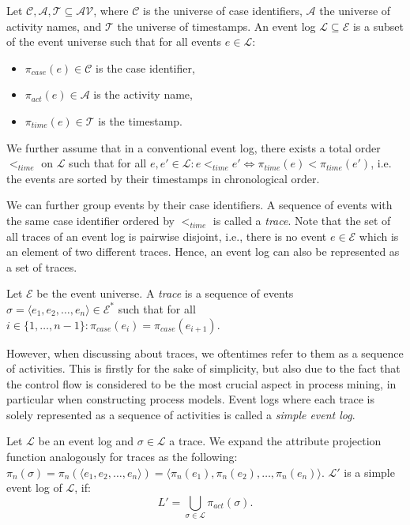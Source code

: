 \begin{definition}
    Let $\mathcal{C, A, T} \subseteq \mathcal{AV}$, where $\mathcal{C}$ is the universe of case identifiers, $\mathcal{A}$ the universe of activity names, and $\mathcal{T}$ the universe of timestamps.  An event log $\mathcal{L} \subseteq \mathcal{E}$ is a subset of the event universe such that for all events $e \in \mathcal{L}$:
    
    \begin{itemize}
        \item $\pi_{case}(e) \in \mathcal{C}$ is the case identifier,
        \item $\pi_{act}(e) \in \mathcal{A}$ is the activity name,
        \item $\pi_{time}(e) \in \mathcal{T}$ is the timestamp.
    \end{itemize}
\end{definition}

We further assume that in a conventional event log, there exists a total order $<_{time}$ on $\mathcal{L}$ such that for all $e, e' \in \mathcal{L}: e <_{time} e' \Leftrightarrow \pi_{time}(e) < \pi_{time}(e')$, i.e. the events are sorted by their timestamps in chronological order.

We can further group events by their case identifiers. A sequence of events with the same case identifier ordered by $<_{time}$ is called a \emph{trace}. Note that the set of all traces of an event log is pairwise disjoint, i.e., there is no event $e \in \mathcal{E}$ which is an element of two different traces. Hence, an event log can also be represented as a set of traces.

\begin{definition}[Trace]
    Let $\mathcal{E}$ be the event universe. A \emph{trace} is a sequence of events $\sigma = \langle e_1, e_2, \dots, e_n \rangle \in \mathcal{E}^*$ such that for all $i \in \{1, \dots, n-1\}: \pi_{case}(e_i) = \pi_{case}(e_{i+1})$.
\end{definition}

However, when discussing about traces, we oftentimes refer to them as a sequence of activities. This is firstly for the sake of simplicity, but also due to the fact that the control flow is considered to be the most crucial aspect in process mining, in particular when constructing process models. Event logs where each trace is solely represented as a sequence of activities is called a \emph{simple event log}.

\begin{definition}
    Let $\mathcal{L}$ be an event log and $\sigma \in \mathcal{L}$ a trace. We expand the attribute projection function analogously for traces as the following: $\pi_n(\sigma) = \pi_n(\langle e_1, e_2, \dots, e_n \rangle) = \langle \pi_n(e_1), \pi_n(e_2), \dots, \pi_n(e_n) \rangle$. $\mathcal{L'}$ is a simple event log of $\mathcal{L}$, if:
    \[
        L' = \bigcup\limits_{\sigma \in \mathcal{L}} \pi_{act}(\sigma).
    \]
\end{definition}

